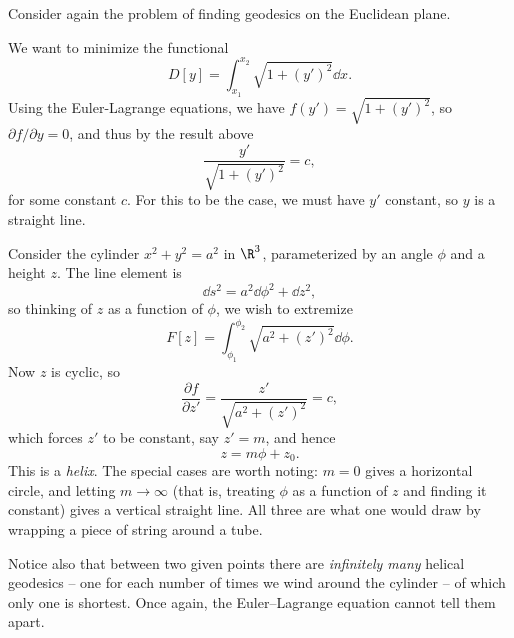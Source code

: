 \begin{example}
	Consider again the problem of finding geodesics on the Euclidean plane. 

	We want to minimize the functional
	$$
	D[y] = \int_{x_1}^{x_2} \sqrt{1 + (y')^2} \dd x.
	$$
	Using the Euler-Lagrange equations, we have $f(y') = \sqrt{1 + (y')^2}$, so $\partial f/\partial y = 0$, and thus by the result above
	$$
	\frac{y'}{\sqrt{1 + (y')^2}} = c,
	$$
	for some constant $c$. For this to be the case, we must have $y'$ constant, so $y$ is a straight line.
\end{example}

\begin{example}
	Consider the cylinder $x^2 + y^2 = a^2$ in $\R^3$, parameterized by an angle $\phi$ and a height $z$. The line element is
	$$
	\dd s^2 = a^2 \dd\phi^2 + \dd z^2,
	$$
	so thinking of $z$ as a function of $\phi$, we wish to extremize
	$$
	F[z] = \int_{\phi_1}^{\phi_2}\sqrt{a^2 + (z')^2}\dd\phi.
	$$
	Now $z$ is cyclic, so
	$$
	\frac{\partial f}{\partial z'} = \frac{z'}{\sqrt{a^2 + (z')^2}} = c,
	$$
	which forces $z'$ to be constant, say $z' = m$, and hence
	$$
	z = m\phi + z_0.
	$$
	This is a \emph{helix}. The special cases are worth noting: $m = 0$ gives a horizontal circle, and letting $m \to \infty$ (that is, treating $\phi$ as a function of $z$ and finding it constant) gives a vertical straight line. All three are what one would draw by wrapping a piece of string around a tube.

	Notice also that between two given points there are \emph{infinitely many} helical geodesics -- one for each number of times we wind around the cylinder -- of which only one is shortest. Once again, the Euler--Lagrange equation cannot tell them apart.
\end{example}


